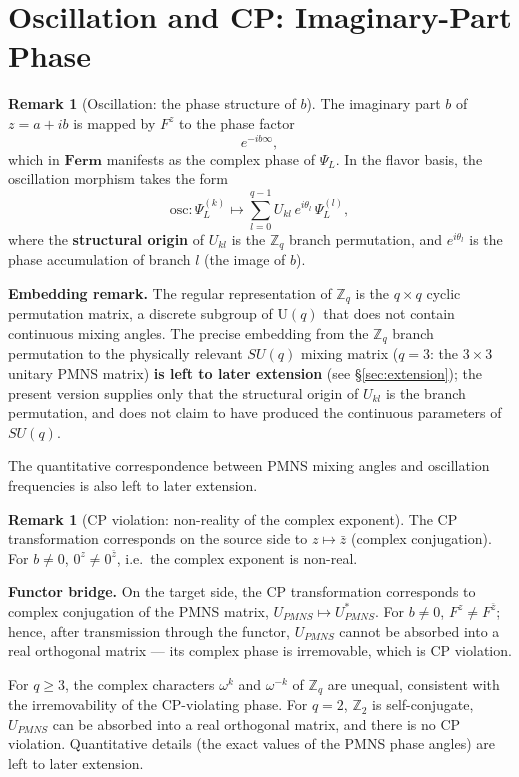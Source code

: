 \documentclass[11pt]{article}
\theoremstyle{plain}
\theoremstyle{definition}
\newtheorem{rem}[thm]{Remark}
\newcommand{\Cat}{\mathbf}
\begin{document}
\section{Oscillation and CP: Imaginary-Part Phase}\label{sec:osc}

\begin{rem}[Oscillation: the phase structure of $b$]\label{rem:osc}
The imaginary part $b$ of $z = a+ib$ is mapped by $F^z$ to the phase factor
\[
e^{-ib\infty},
\]
which in $\Cat{Ferm}$ manifests as the complex phase of $\Psi_L$.
In the flavor basis, the oscillation morphism takes the form
\[
\mathrm{osc}: \Psi_L^{(k)} \longmapsto \sum_{l=0}^{q-1}
U_{kl}\, e^{i\theta_l}\,\Psi_L^{(l)},
\]
where the \textbf{structural origin} of $U_{kl}$ is the $\mathbb{Z}_q$
branch permutation, and $e^{i\theta_l}$ is the phase accumulation of branch
$l$ (the image of $b$).

\textbf{Embedding remark.} The regular representation of $\mathbb{Z}_q$ is
the $q\times q$ cyclic permutation matrix, a discrete subgroup of
$\mathrm{U}(q)$ that does not contain continuous mixing angles. The precise
embedding from the $\mathbb{Z}_q$ branch permutation to the physically
relevant $SU(q)$ mixing matrix ($q=3$: the $3\times 3$ unitary PMNS matrix)
\textbf{is left to later extension} (see \S\ref{sec:extension}); the
present version supplies only that the structural origin of $U_{kl}$ is the
branch permutation, and does not claim to have produced the continuous
parameters of $SU(q)$.

The quantitative correspondence between PMNS mixing angles and oscillation
frequencies is also left to later extension.
\end{rem}

\begin{rem}[CP violation: non-reality of the complex exponent]\label{rem:cp}
The CP transformation corresponds on the source side to $z\mapsto\bar z$
(complex conjugation). For $b\neq 0$, $0^z\neq 0^{\bar z}$, i.e.\ the
complex exponent is non-real.

\textbf{Functor bridge.} On the target side, the CP transformation
corresponds to complex conjugation of the PMNS matrix,
$U_{PMNS}\mapsto U_{PMNS}^*$. For $b\neq 0$, $F^z\neq F^{\bar z}$; hence,
after transmission through the functor, $U_{PMNS}$ cannot be absorbed into
a real orthogonal matrix --- its complex phase is irremovable, which is CP
violation.

For $q\geq 3$, the complex characters $\omega^k$ and $\omega^{-k}$ of
$\mathbb{Z}_q$ are unequal, consistent with the irremovability of the
CP-violating phase. For $q=2$, $\mathbb{Z}_2$ is self-conjugate,
$U_{PMNS}$ can be absorbed into a real orthogonal matrix, and there is no
CP violation. Quantitative details (the exact values of the PMNS phase
angles) are left to later extension.
\end{rem}
\end{document}
